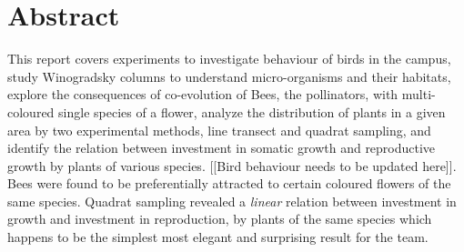 \begingroup
\let\clearpage\relax
\let\cleardoublepage\relax
\let\cleardoublepage\relax

\chapter*{Abstract}
This report covers experiments to investigate behaviour of birds in the campus, study Winogradsky columns to understand micro-organisms and their habitats, explore the consequences of co-evolution of Bees, the pollinators, with multi-coloured single species of a flower, analyze the distribution of plants in a given area by two experimental methods, line transect and quadrat sampling, and identify the relation between investment in somatic growth and reproductive growth by plants of various species. [[Bird behaviour needs to be updated here]]. Bees were found to be preferentially attracted to certain coloured flowers of the same species. Quadrat sampling revealed a \emph{linear} relation between investment in growth and investment in reproduction, by plants of the same species which happens to be the simplest most elegant and surprising result for the team.





\endgroup			

\vfill